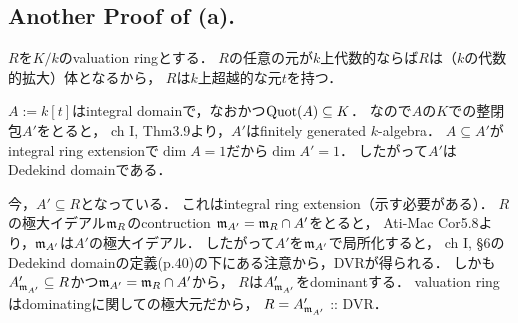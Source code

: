 \documentclass[a4paper]{jsarticle}
\begin{document}
    \subsection*{Another Proof of (a).}
    $R$を$K/k$のvaluation ringとする．
    $R$の任意の元が$k$上代数的ならば$R$は（$k$の代数的拡大）体となるから，
    $R$は$k$上超越的な元$t$を持つ．

    $A:=k[t]$はintegral domainで，なおかつ$\operatorname{Quot}(A) \subseteq K$．
    なので$A$の$K$での整閉包$A'$をとると，
    ch I, Thm3.9より，$A'$はfinitely generated $k$-algebra．
    $A \subseteq A'$がintegral ring extensionで$\dim A=1$だから$\dim A'=1$．
    したがって$A'$はDedekind domainである．

    今，$A' \subseteq R$となっている．
    これはintegral ring extension（示す必要がある）．
    $R$の極大イデアル$\mathfrak{m}_R$のcontruction $\mathfrak{m}_{A'}=\mathfrak{m}_R \cap A'$をとると，
    Ati-Mac Cor5.8より，$\mathfrak{m}_{A'}$は$A'$の極大イデアル．
    したがって$A'$を$\mathfrak{m}_{A'}$で局所化すると，
    ch I, \S 6のDedekind domainの定義(p.40)の下にある注意から，DVRが得られる．
    しかも$A'_{\mathfrak{m}_{A'}} \subseteq R$かつ$\mathfrak{m}_{A'}=\mathfrak{m}_R \cap A'$から，
    $R$は$A'_{\mathfrak{m}_{A'}}$をdominantする．
    valuation ringはdominatingに関しての極大元だから，
    $R=A'_{\mathfrak{m}_{A'}}$ :: DVR．
\end{document}
